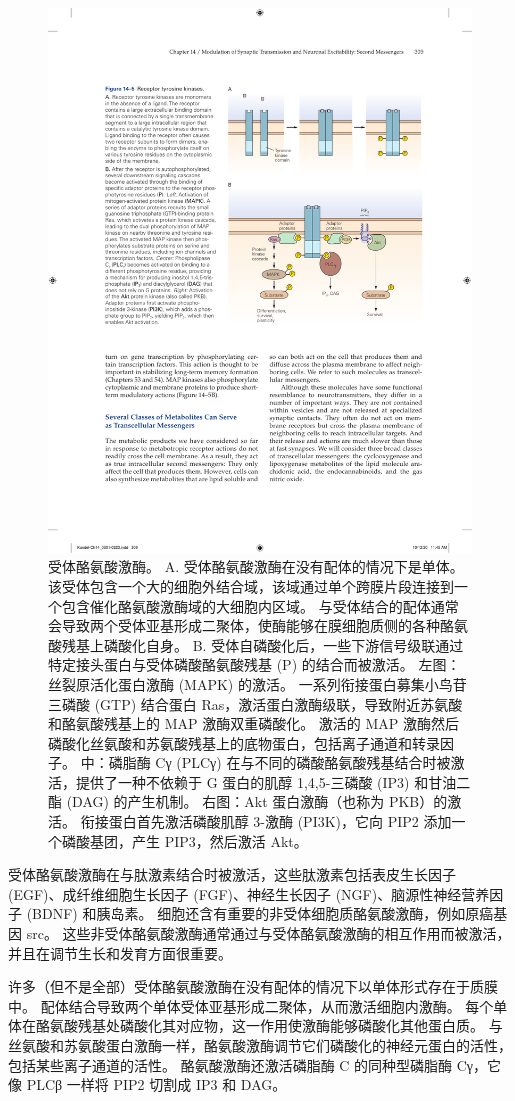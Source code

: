 \begin{figure}[htbp]
	\centering
	\includegraphics[width=0.7\linewidth]{chap14/fig_14_5}
	\caption{受体酪氨酸激酶。 A. 受体酪氨酸激酶在没有配体的情况下是单体。 该受体包含一个大的细胞外结合域，该域通过单个跨膜片段连接到一个包含催化酪氨酸激酶域的大细胞内区域。 与受体结合的配体通常会导致两个受体亚基形成二聚体，使酶能够在膜细胞质侧的各种酪氨酸残基上磷酸化自身。 B. 受体自磷酸化后，一些下游信号级联通过特定接头蛋白与受体磷酸酪氨酸残基 (P) 的结合而被激活。 左图：丝裂原活化蛋白激酶 (MAPK) 的激活。 一系列衔接蛋白募集小鸟苷三磷酸 (GTP) 结合蛋白 Ras，激活蛋白激酶级联，导致附近苏氨酸和酪氨酸残基上的 MAP 激酶双重磷酸化。 激活的 MAP 激酶然后磷酸化丝氨酸和苏氨酸残基上的底物蛋白，包括离子通道和转录因子。 中：磷脂酶 Cγ (PLCγ) 在与不同的磷酸酪氨酸残基结合时被激活，提供了一种不依赖于 G 蛋白的肌醇 1,4,5-三磷酸 (IP3) 和甘油二酯 (DAG) 的产生机制。 右图：Akt 蛋白激酶（也称为 PKB）的激活。 衔接蛋白首先激活磷酸肌醇 3-激酶 (PI3K)，它向 PIP2 添加一个磷酸基团，产生 PIP3，然后激活 Akt。}
	\label{fig:14_5}
\end{figure}


受体酪氨酸激酶在与肽激素结合时被激活，这些肽激素包括表皮生长因子 (EGF)、成纤维细胞生长因子 (FGF)、神经生长因子 (NGF)、脑源性神经营养因子 (BDNF) 和胰岛素。
细胞还含有重要的非受体细胞质酪氨酸激酶，例如原癌基因 src。
这些非受体酪氨酸激酶通常通过与受体酪氨酸激酶的相互作用而被激活，并且在调节生长和发育方面很重要。


许多（但不是全部）受体酪氨酸激酶在没有配体的情况下以单体形式存在于质膜中。
配体结合导致两个单体受体亚基形成二聚体，从而激活细胞内激酶。
每个单体在酪氨酸残基处磷酸化其对应物，这一作用使激酶能够磷酸化其他蛋白质。
与丝氨酸和苏氨酸蛋白激酶一样，酪氨酸激酶调节它们磷酸化的神经元蛋白的活性，包括某些离子通道的活性。 
酪氨酸激酶还激活磷脂酶 C 的同种型磷脂酶 Cγ，它像 PLCβ 一样将 PIP2 切割成 IP3 和 DAG。


